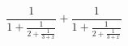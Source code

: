\documentclass{minimal}
\begin{document}
$$ \frac{1}{\displaystyle 1+     \frac{1}{\displaystyle 2+     \frac{1}{\displaystyle 3+x}}} +   \frac{1}{1+\frac{1}{2+\frac{1}{3+x}}}$$
\end{document}

